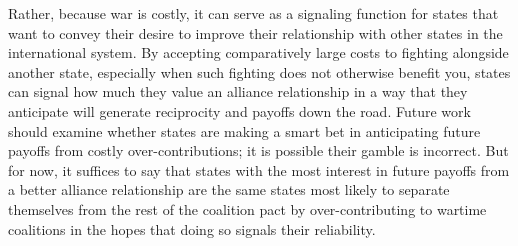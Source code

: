 \documentclass[12pt,letterpaper]{article}
\begin{document}
	Rather, because war is costly, it can serve as a signaling function for states that want to convey their desire to improve their relationship with other states in the international system. By accepting comparatively large costs to fighting alongside another state, especially when such fighting does not otherwise benefit you, states can signal how much they value an alliance relationship in a way that they anticipate will generate reciprocity and payoffs down the road. Future work should examine whether states are making a smart bet in anticipating future payoffs from costly over-contributions; it is possible their gamble is incorrect. But for now, it suffices to say that states with the most interest in future payoffs from a better alliance relationship are the same states most likely to separate themselves from the rest of the coalition pact by over-contributing to wartime coalitions in the hopes that doing so signals their reliability.



\end{document}
